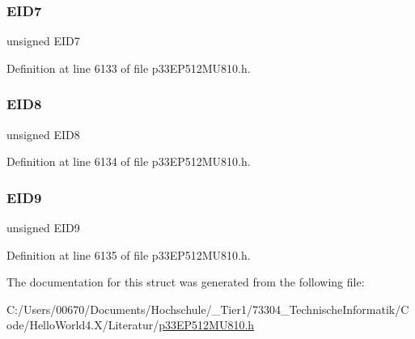 \subsubsection{\texorpdfstring{E\+I\+D7}{EID7}}
{\footnotesize\ttfamily unsigned E\+I\+D7}



Definition at line 6133 of file p33\+E\+P512\+M\+U810.\+h.

\mbox{\label{structtag_c2_r_x_m2_e_i_d_b_i_t_s_acca25e0b7d86eb499d01f85222baea87}} 
\subsubsection{\texorpdfstring{E\+I\+D8}{EID8}}
{\footnotesize\ttfamily unsigned E\+I\+D8}



Definition at line 6134 of file p33\+E\+P512\+M\+U810.\+h.

\mbox{\label{structtag_c2_r_x_m2_e_i_d_b_i_t_s_ac6748f73d4ada8538b06548be4f396c2}} 
\subsubsection{\texorpdfstring{E\+I\+D9}{EID9}}
{\footnotesize\ttfamily unsigned E\+I\+D9}



Definition at line 6135 of file p33\+E\+P512\+M\+U810.\+h.



The documentation for this struct was generated from the following file\+:\begin{DoxyCompactItemize}
\item 
C\+:/\+Users/00670/\+Documents/\+Hochschule/\+\_\+\+Tier1/73304\+\_\+\+Technische\+Informatik/\+Code/\+Hello\+World4.\+X/\+Literatur/\hyperlink{p33_e_p512_m_u810_8h}{p33\+E\+P512\+M\+U810.\+h}\end{DoxyCompactItemize}
